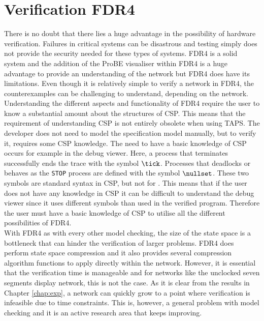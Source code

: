 \section{Verification FDR4}
There is no doubt that there lies a huge advantage in the possibility of hardware verification. Failures in critical systems can be disastrous and testing simply does not provide the security needed for these types of systems. FDR4 is a solid system and the addition of the ProBE visualiser within FDR4 is a huge advantage to provide an understanding of the network but FDR4 does have its limitations. Even though it is relatively simple to verify a network in FDR4, the counterexamples can be challenging to understand, depending on the network. Understanding the different aspects and functionality of FDR4 require the user to know a substantial amount about the structures of CSP. This means that the requirement of understanding CSP is not entirely obsolete when using TAPS. The developer does not need to model the specification model manually, but to verify it, requires some CSP knowledge. The need to have a basic knowledge of CSP occurs for example in the debug viewer. Here, a process that terminates successfully ends the trace with the symbol $\tick$. Processes that deadlocks or behaves as the \texttt{STOP} process are defined with the symbol $\nullset$. These two symbols are standard syntax in CSP, but not for \cspm{}. This means that if the user does not have any knowledge in CSP it can be difficult to understand the debug viewer since it uses different symbols than used in the verified \cspm{} program. Therefore the user must have a basic knowledge of CSP to utilise all the different possibilities of FDR4. \\

With FDR4 as with every other model checking, the size of the state space is a bottleneck that can hinder the verification of larger problems. FDR4 does perform state space compression and it also provides several compression algorithm functions to apply directly within the \cspm{} network.
However, it is essential that the verification time is manageable and for networks like the unclocked seven segments display network, this is not the case. As it is clear from the results in Chapter \ref{chap:exp}, a network can quickly grow to a point where verification is infeasible due to time constraints. This is, however, a general problem with model checking and it is an active research area that keeps improving.